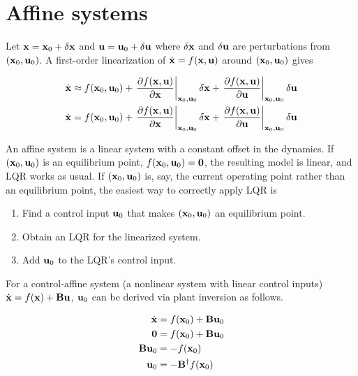 \section{Affine systems}

Let $\mathbf{x} = \mathbf{x}_0 + \delta\mathbf{x}$ and
$\mathbf{u} = \mathbf{u}_0 + \delta\mathbf{u}$ where $\delta\mathbf{x}$ and $\delta\mathbf{u}$
are perturbations from $(\mathbf{x}_0, \mathbf{u}_0)$. A first-order linearization of
$\dot{\mathbf{x}} = f(\mathbf{x}, \mathbf{u})$ around $(\mathbf{x}_0, \mathbf{u}_0)$ gives

\begin{align*}
  \dot{\mathbf{x}} &\approx f(\mathbf{x}_0, \mathbf{u}_0) +
    \left.\frac{\partial f(\mathbf{x}, \mathbf{u})}{\partial \mathbf{x}}
    \right|_{\mathbf{x}_0, \mathbf{u}_0}\delta\mathbf{x} +
    \left.\frac{\partial f(\mathbf{x}, \mathbf{u})}{\partial \mathbf{u}}
    \right|_{\mathbf{x}_0, \mathbf{u}_0}\delta\mathbf{u} \\
  \dot{\mathbf{x}} &= f(\mathbf{x}_0, \mathbf{u}_0) +
    \left.\frac{\partial f(\mathbf{x}, \mathbf{u})}{\partial \mathbf{x}}
    \right|_{\mathbf{x}_0, \mathbf{u}_0}\delta\mathbf{x} +
    \left.\frac{\partial f(\mathbf{x}, \mathbf{u})}{\partial \mathbf{u}}
    \right|_{\mathbf{x}_0, \mathbf{u}_0}\delta\mathbf{u} \\
\end{align*}

An affine system is a linear system with a constant offset in the dynamics. If
$(\mathbf{x}_0, \mathbf{u}_0)$ is an equilibrium point,
$f(\mathbf{x}_0, \mathbf{u}_0) = \mathbf{0}$, the resulting \gls{model} is linear, and
LQR works as usual. If $(\mathbf{x}_0, \mathbf{u}_0)$ is, say, the current operating
point rather than an equilibrium point, the easiest way to correctly apply LQR
is

\begin{enumerate}
  \item Find a control input $\mathbf{u}_0$ that makes $(\mathbf{x}_0, \mathbf{u}_0)$ an
    equilibrium point.
  \item Obtain an LQR for the linearized system.
  \item Add $\mathbf{u}_0$ to the LQR's control input.
\end{enumerate}

For a control-affine \gls{system} (a nonlinear \gls{system} with linear control
inputs) $\dot{\mathbf{x}} = f(\mathbf{x}) + \mathbf{B}\mathbf{u}$, $\mathbf{u}_0$ can be
derived via plant inversion as follows.

\begin{align}
  \dot{\mathbf{x}} &= f(\mathbf{x}_0) + \mathbf{B}\mathbf{u}_0 \nonumber \\
  \mathbf{0} &= f(\mathbf{x}_0) + \mathbf{B}\mathbf{u}_0 \nonumber \\
  \mathbf{B}\mathbf{u}_0 &= -f(\mathbf{x}_0) \nonumber \\
  \mathbf{u}_0 &= -\mathbf{B}^\dagger f(\mathbf{x}_0)
\end{align}

